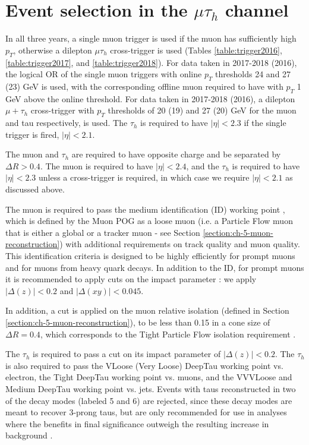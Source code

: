 \section{Event selection in the $\mu\tau_{h}$ channel}
\label{section:ch-7-event-selection-mutau}
In all three years, a single muon trigger is used if the muon has sufficiently high $p_{T}$, otherwise a dilepton $\mu\tau_{h}$ cross-trigger is used (Tables \ref{table:trigger2016}, \ref{table:trigger2017}, and \ref{table:trigger2018}). For data taken in 2017-2018 (2016), the logical OR of the single muon triggers with online $p_{T}$ thresholds 24 and 27 (23) GeV is used, with the corresponding offline muon required to have with $p_{T}$ 1 GeV above the online threshold. For data taken in 2017-2018 (2016), a dilepton $\mu + \tau_{h}$ cross-trigger with $p_{T}$ thresholds of 20 (19) and 27 (20) GeV for the muon and tau respectively, is used. The $\tau_{h}$ is required to have $|\eta| < 2.3$ if the single trigger is fired, $|\eta| < 2.1$. 

The muon and $\tau_h$ are required to have opposite charge and be separated by $\Delta R > 0.4$. The muon is required to have $|\eta| < 2.4$, and the $\tau_{h}$ is required to have $|\eta| < 2.3$ unless a cross-trigger is required, in which case we require $|\eta| < 2.1$ as discussed above.

The muon is required to pass the medium identification (ID) working point \cite{twiki_MUON_POG_Run2_guide}, which is defined by the Muon POG as a loose muon (i.e. a Particle Flow muon that is either a global or a tracker muon - see Section \ref{section:ch-5-muon-reconstruction}) with additional requirements on track quality and muon quality. This identification criteria is designed to be highly efficiently for prompt muons and for muons from heavy quark decays. In addition to the ID, for prompt muons it is recommended to apply cuts on the impact parameter \cite{twiki_MUON_POG_Run2_guide}: we apply $|\Delta(z)| < 0.2$ and $|\Delta(xy)| < 0.045$. 

In addition, a cut is applied on the muon relative isolation (defined in Section \ref{section:ch-5-muon-reconstruction}), to be less than 0.15 in a cone size of $\Delta R = 0.4$, which corresponds to the Tight Particle Flow isolation requirement \cite{twiki_MUON_POG_Run2_guide}.

The $\tau_h$ is required to pass a cut on its impact parameter of $|\Delta(z)| < 0.2$. The $\tau_h$ is also required to pass the VLoose (Very Loose) DeepTau working point vs. electron, the Tight DeepTau working point vs. muons, and the VVVLoose and Medium DeepTau working point vs. jets. Events with taus reconstructed in two of the decay modes (labeled 5 and 6) are rejected, since these decay modes are meant to recover 3-prong taus, but are only recommended for use in analyses where the benefits in final significance outweigh the resulting increase in background \cite{twiki_TAU_POG_tauidrecommendationforrun2}.

